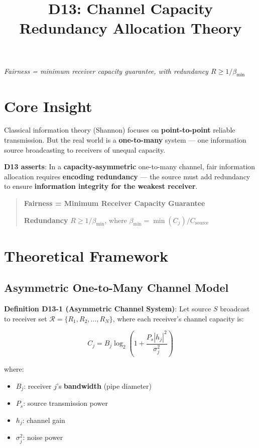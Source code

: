 \documentclass[12pt,a4paper]{article}
\title{\textbf{D13: Channel Capacity Redundancy Allocation Theory}}
\author{}
\date{}
\newcommand{\calR}{\mathcal{R}}
\begin{document}
\maketitle

\begin{center}
\textit{Fairness = minimum receiver capacity guarantee, with redundancy $R \geq 1/\beta_{\min}$}
\end{center}

\section{Core Insight}

Classical information theory (Shannon) focuses on \textbf{point-to-point} reliable transmission. But the real world is a \textbf{one-to-many} system --- one information source broadcasting to receivers of unequal capacity.

\textbf{D13 asserts}: In a \textbf{capacity-asymmetric} one-to-many channel, fair information allocation requires \textbf{encoding redundancy} --- the source must add redundancy to ensure \textbf{information integrity for the weakest receiver}.

\begin{quote}
\textbf{Fairness = Minimum Receiver Capacity Guarantee}

\textbf{Redundancy} $R \geq 1/\beta_{\min}$, where $\beta_{\min} = \min(C_j)/C_{\text{source}}$
\end{quote}

\section{Theoretical Framework}

\subsection{Asymmetric One-to-Many Channel Model}

\textbf{Definition D13-1 (Asymmetric Channel System)}: Let source $S$ broadcast to receiver set $\calR = \{R_1, R_2, \ldots, R_N\}$, where each receiver's channel capacity is:

$$C_j = B_j \log_2\left(1 + \frac{P_s |h_j|^2}{\sigma_j^2}\right)$$

where:
\begin{itemize}
    \item $B_j$: receiver $j$'s \textbf{bandwidth} (pipe diameter)
    \item $P_s$: source transmission power
    \item $h_j$: channel gain
    \item $\sigma_j^2$: noise power
\end{itemize}
\end{document}

